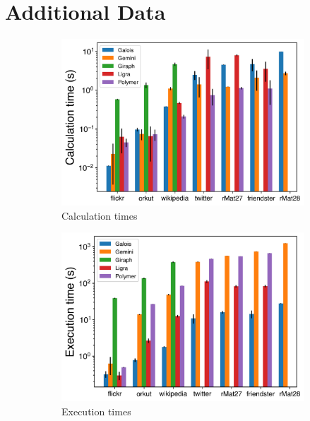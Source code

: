 \documentclass{meetings}
\begin{document}
\section{Additional Data}
\clearpage
\begin{figure}
	\begin{subfigure}{0.32\textwidth}
		\includegraphics[width=\linewidth]{../../plots/singleNodeSSSP_calcTime.png}
		\caption{Calculation times}
		\label{fig:singleNodeSSSP_calc}
	\end{subfigure}
	\hfil
	\begin{subfigure}{0.32\textwidth}
		\includegraphics[width=\linewidth]{../../plots/singleNodeSSSP_execTime.png}
		\caption{Execution times}
		\label{fig:singleNodeSSSP_exec}
	\end{subfigure}
	\hfil
	\begin{subfigure}{0.32\textwidth}

\end{subfigure}
\end{figure}
\end{document}
